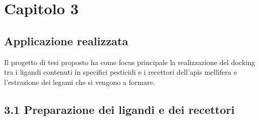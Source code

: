 \def\baselinestretch{1}
\chapter*{Capitolo 3} \label{cap3}
\def\baselinestretch{1.66}

\section*{Applicazione realizzata}
\def\baselinestretch{1.66}
\noindent Il progetto di tesi proposto ha come focus principale la realizzazione del docking tra i ligandi contenuti in specifici pesticidi e i recettori dell'apis mellifera e l'estrazione dei legami che si vengono a formare.

\section*{3.1 Preparazione dei ligandi e dei recettori}
\def\baselinestretch{1.66}
\noindent 